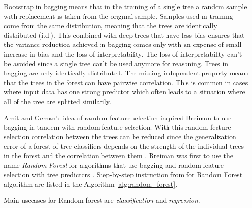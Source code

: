 Bootstrap in bagging means that in the training of a single tree a random sample with replacement is taken from the original sample. Samples used in training come from the same distribution, meaning that the trees are identically distributed (i.d.). This combined with deep trees that have less bias ensures that the variance reduction achieved in bagging comes only with an expense of small increase in bias and the loss of interpretability. The loss of interpretability can't be avoided since a single tree can't be used anymore for reasoning. Trees in bagging are only identically distributed. The missing independent property means that the trees in the forest can have pairwise correlation. This is common in cases where input data has one strong predictor which often leads to a situation where all of the tree are splitted similarily. \cite{friedman2001elements}

Amit and Geman's \cite{amit1997shape} idea of random feature selection inspired Breiman to use bagging in tandem with random feature selection. With this random feature selection correlation between the trees can be reduced since the generalization error of a forest of tree classifiers depends on the strength of the individual trees in the forest and the correlation between them \cite{breiman2001random}. Breiman was first to use the name \textit{Random Forest} for algorithms that use bagging and random feature selection with tree predictors \cite{breiman2001random}. Step-by-step instruction from \cite{friedman2001elements} for Random Forest algorithm are listed in the Algorithm \ref{alg:random_forest}.

Main usecases for Random forest are \textit{classification} and \textit{regression}.

